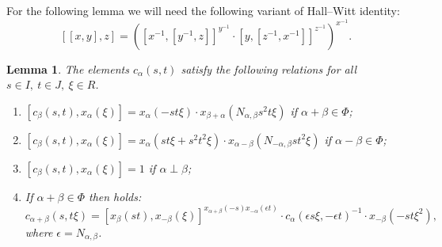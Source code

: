 \documentclass[oneside, 8pt]{amsart}
\newtheorem{lemma}{Lemma}
\theoremstyle{remark}
\theoremstyle{definition}
\numberwithin{lemma}{section}
\numberwithin{prop}{section}
\numberwithin{corollary}{section}
\numberwithin{externaltheorem}{section}
\numberwithin{equation}{section}
\begin{document}
For the following lemma we will need the following variant of Hall--Witt identity:
\begin{equation} \label{HW-variant} [[x, y], z] = \left([x^{-1}, [ y^{-1}, z]] ^ {y^{-1}} \cdot [y, [ z^{-1}, x^{-1}]] ^ {z^{-1}} \right)^{x^{-1}}.\end{equation}
\begin{lemma} \label{Crels}
The elements $c_\alpha(s, t)$ satisfy the following relations for all $s\in I,\ t\in J,\ \xi\in R$.
 \begin{enumerate}
 \item \label{C1} $[c_\beta(s, t), x_{\alpha}(\xi)] = x_{\alpha}(- st\xi) \cdot x_{\beta+\alpha}(N_{\alpha,\beta}s^2t\xi)$ if $\alpha+\beta \in \Phi$;
 \item \label{C2} $[c_\beta(s, t), x_{\alpha}(\xi)] = x_{\alpha}(st\xi + s^2t^2\xi) \cdot x_{\alpha-\beta}(N_{-\alpha, \beta}st^2\xi)$ if $\alpha-\beta \in \Phi$;  
 \item \label{C3} $[c_\beta(s, t), x_{\alpha}(\xi)] = 1$ if $\alpha \perp \beta$;  
 \item \label{C4} If $\alpha+\beta\in\Phi$ then holds:
  \[c_{\alpha+\beta}(s, t\xi) = [x_{\beta}(st), x_{-\beta}(\xi)] ^ {x_{\alpha+\beta}(-s) x_{-\alpha}(\epsilon t)} \cdot c_{\alpha}(\epsilon s\xi, -\epsilon t)^{-1} \cdot x_{-\beta}(-st\xi^2),\]
  where $\epsilon = N_{\alpha,\beta}$.
 \end{enumerate}
\end{lemma}
\end{document}
